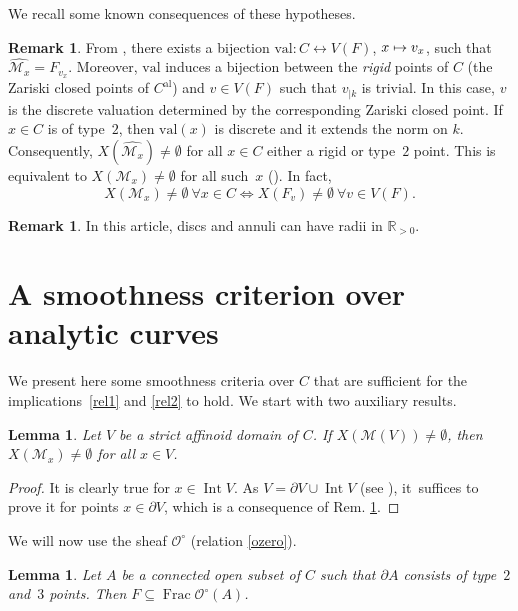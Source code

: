 \documentclass[JEP,XML,SOM,Unicode,NoFloatCountersInSection,published]{cedram}
\newcommand{\mto}{\mathchoice{\longmapsto}{\mapsto}{\mapsto}{\mapsto}}
\newcommand{\al}{\mathrm{al}}
\newcommand{\val}{\mathrm{val}}
\DeclareMathOperator{\Frac}{Frac}
\DeclareMathOperator{\Int}{Int}
\newtheorem{lm}[thm]{Lemma}
\theoremstyle{definition}
\newtheorem{rem}[thm]{Remark}
\begin{document}
We recall some known consequences of these hypotheses.

\begin{rem} \label{1.2}
From \cite[Prop.\,3.15]{une}, there exists a bijection ${\val: C \leftrightarrow V(F)}$, ${x \mto v_x}$, such that $\widehat{\mathscr{M}_x}=F_{v_x}$. Moreover, $\val$ induces a bijection between the \emph{rigid} points of $C$ (\ie the Zariski closed points of $C^{\al}$) and $v \in V(F)$ such that $v_{|k}$ is trivial. In this case, $v$ is the discrete valuation determined by the corresponding Zariski closed point. If $x \in C$ is of type~$2$, then $\val(x)$ is discrete and it extends the norm on $k$.
Consequently, ${X(\widehat{\mathscr{M}_x}) \neq \emptyset}$ for all ${x \in C}$ either a rigid or type~$2$ point. This is equivalent to $X(\mathscr{M}_x) \neq \emptyset$ for all such~$x$ (\cf \cite[Cor.\,3.17]{une}). In fact,
\begin{equation} \label{artin}
X(\mathscr{M}_x) \neq \emptyset \ \forall x \in C
\iff X(F_v) \neq \emptyset \ \forall v \in V(F).
\end{equation}
\end{rem}

\begin{rem} \label{radii}
In this article, discs and annuli can have radii in $\mathbb{R}_{>0}$.
\end{rem}

\section{A smoothness criterion over analytic curves} \label{section1}

We present here some smoothness criteria over $C$ that are sufficient for the implications~\eqref{rel1} and \eqref{rel2} to hold. We start with two auxiliary results.

\begin{lm} \label{1.3bis}
Let $V$ be a strict affinoid domain of $C$. If $X(\mathscr{M}(V)) \neq \emptyset$, then ${X(\mathscr{M}_x) \neq \emptyset}$ for all $x \in V$.
\end{lm}

\begin{proof}
It is clearly true for $x \in \Int V$. As $V=\partial{V} \cup \Int V$ (see \cite[Cor.\,1.8.11]{doktoratura}), it~suffices to prove it for points $x \in \partial{V}$, which is a consequence of Rem. \ref{1.2}.
\end{proof}

We will now use the sheaf $\mathcal{O}^{\circ}$ (\cf relation \eqref{ozero}).
\begin{lm} \label{1.5.1}
Let $A$ be a connected open subset of $C$ such that $\partial{A}$ consists of type~$2$ and~$3$ points. Then $F \subseteq \Frac \mathcal{O}^{\circ}(A)$.
\end{lm}
\end{document}
